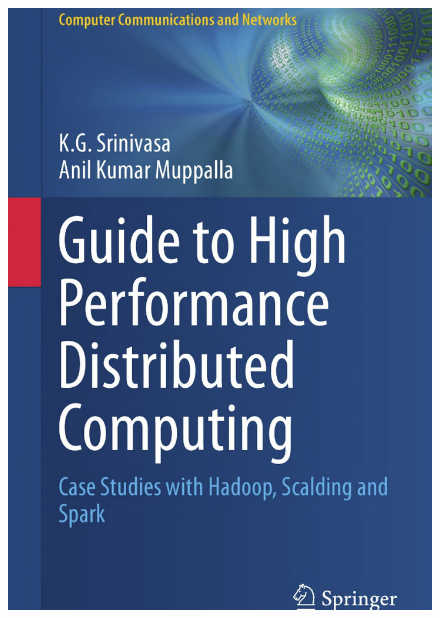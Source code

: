 \begin{frame}
\begin{figure}[ht]
\begin{minipage}[c][1\width]{
				0.4\textwidth}
		\includegraphics[width=\linewidth,height=.7\textheight]{./Figures/chapter-00/high-performance-computing.png}
	\end{minipage}
\end{figure}
\end{frame}

